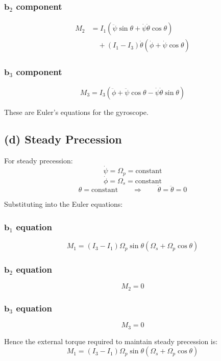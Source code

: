 \subsubsection*{$\mathbf{b}_2$ component}

\begin{align}
M_2
&=
I_1(\ddot\psi\sin\theta+\dot\psi\dot\theta\cos\theta)
\\
&\quad
+
(I_1-I_3)
\dot\theta(\dot\phi+\dot\psi\cos\theta)
\end{align}

\subsubsection*{$\mathbf{b}_3$ component}

\[
M_3
=
I_3(\ddot\phi+\ddot\psi\cos\theta
-\dot\psi\dot\theta\sin\theta)
\]

These are Euler's equations for the gyroscope.

\subsection*{(d) Steady Precession}

For steady precession:
\[
\dot\psi = \Omega_p = \text{constant}
\]
\[
\dot\phi = \Omega_s = \text{constant}
\]
\[
\theta = \text{constant}
\qquad\Rightarrow\qquad
\dot\theta = \ddot\theta = 0
\]

Substituting into the Euler equations:

\subsubsection*{$\mathbf{b}_1$ equation}

\[
M_1
=
(I_3-I_1)
\Omega_p\sin\theta
(\Omega_s+\Omega_p\cos\theta)
\]

\subsubsection*{$\mathbf{b}_2$ equation}

\[
M_2 = 0
\]

\subsubsection*{$\mathbf{b}_3$ equation}

\[
M_3 = 0
\]

Hence the external torque required to maintain steady precession is:
\[
\boxed{
M_1
=
(I_3-I_1)
\Omega_p\sin\theta
(\Omega_s+\Omega_p\cos\theta)
}
\]

